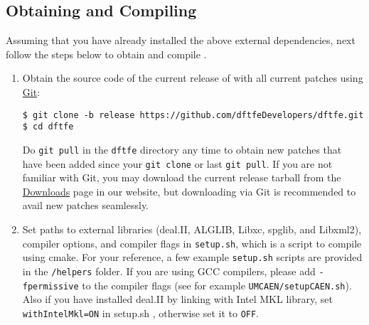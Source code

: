 \subsection{Obtaining and Compiling \dftfe{}}
Assuming that you have already installed the above external dependencies, next follow the steps below to obtain and compile \dftfe{}.
\begin{enumerate}
\item Obtain the source code of the current release of \dftfe{} with all current patches using \href{https://git-scm.com/}{Git}:
\begin{verbatim}
$ git clone -b release https://github.com/dftfeDevelopers/dftfe.git
$ cd dftfe
\end{verbatim}
Do \verb|git pull| in the \verb|dftfe| directory any time to obtain new patches that have been added since your \verb|git clone| or last \verb|git pull|.
If you are not familiar with Git, you may download the current release tarball from the \href{https://sites.google.com/umich.edu/dftfe/download}{Downloads} page in our website, but downloading via Git is recommended to avail new patches seamlessly. 





\item Set paths to external libraries (deal.II, ALGLIB, Libxc, spglib, and Libxml2), compiler options, and compiler flags in \verb|setup.sh|, which is a script to compile \dftfe{} using cmake. For your reference, a few example \verb|setup.sh| scripts are provided in the \verb|/helpers| folder. If you are using GCC compilers, please add \verb|-fpermissive| to the compiler flags (see for example \verb|UMCAEN/setupCAEN.sh|). Also if you have installed deal.II by linking with Intel MKL library, set \verb|withIntelMkl=ON| in setup.sh , otherwise set it to \verb|OFF|. 


\end{enumerate}

